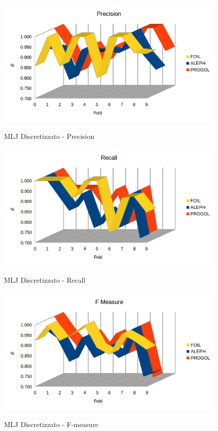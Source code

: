 \begin{figure}[H]
	\includegraphics[width=1.1\textwidth]{img/datasetGraph/mlj/discr/precision.png}
	\label{mljdiscr-Precision}
	\caption{MLJ Discretizzato - Precision}
\end{figure}

\begin{figure}[H]
	\includegraphics[width=1.1\textwidth]{img/datasetGraph/mlj/discr/recall.png}
	\label{mljdiscr-Recall}
	\caption{MLJ Discretizzato - Recall}
\end{figure}

\begin{figure}[H]
	\includegraphics[width=1.1\textwidth]{img/datasetGraph/mlj/discr/fm.png}
	\label{mljdiscr-F-measure}
	\caption{MLJ Discretizzato - F-measure}
\end{figure}

